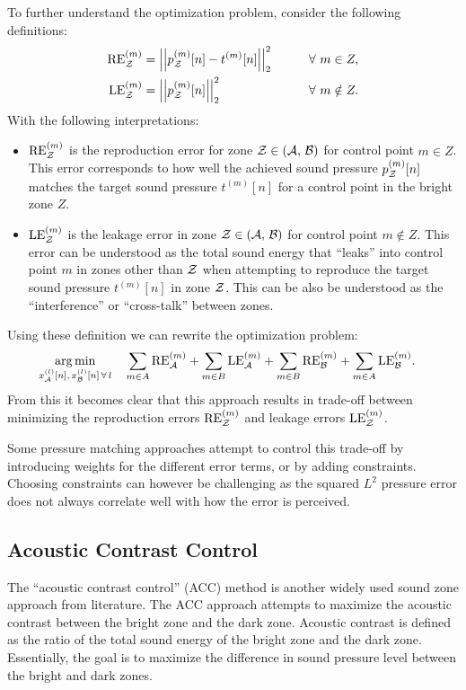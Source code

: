 To further understand the optimization problem, consider the following definitions: 
\begin{alignat}{2}
    \text{RE}^{(m)}_\zz &= \norm[2][2]{p_\zz^{(m)}[n] - t^{(m)}[n]} \qquad&& \forall\,\, m\in Z, \label{eq:sound_zone:approaches:RE}\\
    \text{LE}^{(m)}_\zz &= \norm[2][2]{p_\zz^{(m)}[n]} \qquad&& \forall\,\, m\notin Z. \label{eq:sound_zone:approaches:LE} 
\end{alignat}
With the following interpretations:
\begin{itemize}
    \item $\text{RE}^{(m)}_{\mathcal{Z}}$ is the reproduction error for zone $\mathcal{Z} \in \left(\mathcal{A},\,\mathcal{B}\right)$ 
        for control point $m \in Z$.
        This error corresponds to how well the achieved sound pressure $p_{\mathcal{Z}}^{(m)}[n]$ matches the 
        target sound pressure $t^{(m)}[n]$ for a control point in the 
        bright zone $Z$. 
    \item $\text{LE}^{(m)}_{\mathcal{Z}}$ is the leakage error in zone $\mathcal{Z} \in \left(\mathcal{A},\,\mathcal{B}\right)$ for control point $m \notin Z$.
        This error can be understood as the total sound energy that ``leaks'' into control point $m$ in zones 
        other than $\mathcal{Z}$ when attempting to reproduce the target sound pressure $t^{(m)}[n]$ in zone $\mathcal{Z}$. 
        This can be also be understood as the ``interference'' or ``cross-talk'' between zones.
\end{itemize}
Using these definition we can rewrite the optimization problem:
\begin{align}
    \operatorname*{arg\,min}_{x_{\mathcal{A}}^{(l)}[n],\,x_{\mathcal{B}}^{(l)}[n]\,\forall\,l}\quad 
       &\sum_{m\in A} \text{RE}^{(m)}_{\mathcal{A}} +  \sum_{m\in B} \text{LE}^{(m)}_{\mathcal{A}} + \sum_{m\in B} \text{RE}^{(m)}_{\mathcal{B}} + \sum_{m\in A} \text{LE}^{(m)}_{\mathcal{B}}
   .
\end{align}
From this it becomes clear that this approach results in trade-off between minimizing the 
reproduction errors $\text{RE}^{(m)}_{\mathcal{Z}}$ 
and leakage errors $\text{LE}^{(m)}_{\mathcal{Z}}$. 

Some pressure matching approaches attempt to control this trade-off by introducing weights for the different error terms, 
or by adding constraints.
Choosing constraints can however be challenging as the squared $L^2$ pressure error does not always correlate well with how
the error is perceived.

\subsection{Acoustic Contrast Control}
\label{ch:sound_zone:approaches:acoustic_contrast_control}
The ``acoustic contrast control'' (ACC) method is another widely used sound zone approach from literature.
The ACC approach attempts to maximize the acoustic contrast between the bright zone and the dark zone. 
Acoustic contrast is defined as the ratio of the total sound energy of the bright zone and the dark zone.
Essentially, the goal is to maximize the difference in sound pressure level between the bright and dark zones.

